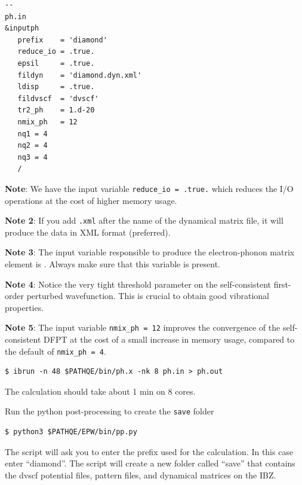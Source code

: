 \documentclass[a4paper,11pt,serif]{article}
\begin{document}
\begin{scriptsize}
 \begin{Verbatim}[frame=single]
--                                                                                                  ph.in
&inputph
   prefix    = 'diamond'
   reduce_io = .true.
   epsil     = .true.
   fildyn    = 'diamond.dyn.xml'
   ldisp     = .true.
   fildvscf  = 'dvscf'
   tr2_ph    = 1.d-20
   nmix_ph   = 12
   nq1 = 4
   nq2 = 4
   nq3 = 4
   /
\end{Verbatim}
\end{scriptsize}
\begin{footnotesize}
   \textbf{Note}: We have the input variable \texttt{reduce\_io = .true.} which reduces the I/O operations at the cost of higher memory usage.

   \textbf{Note 2}: If you add \texttt{.xml} after the name of the dynamical matrix file, it will
   produce the data in XML format (preferred).

   \textbf{Note 3}: The input variable responsible to produce the electron-phonon matrix element is . Always make sure that this variable is present.

   \textbf{Note 4}: Notice the very tight  threshold parameter on the self-consistent first-order perturbed wavefunction. This is crucial to obtain good vibrational properties.

   \textbf{Note 5}: The input variable \texttt{nmix\_ph = 12} improves the convergence of the self-consistent DFPT at the cost of a small increase in memory usage, compared to the default of \texttt{nmix\_ph = 4}.
\end{footnotesize}

\begin{verbatim}
$ ibrun -n 48 $PATHQE/bin/ph.x -nk 8 ph.in > ph.out
\end{verbatim}

The calculation should take about 1 min on 8 cores.

\vspace{0.5cm}
\action Run the python post-processing to create the \texttt{save} folder
\begin{verbatim}
$ python3 $PATHQE/EPW/bin/pp.py
\end{verbatim}
The script will ask you to enter the prefix used for the calculation. In this case enter ``diamond''.
%
The script will create a new folder called ``save'' that contains the dvscf potential files, pattern files, and dynamical
matrices on the IBZ.
\end{document}
